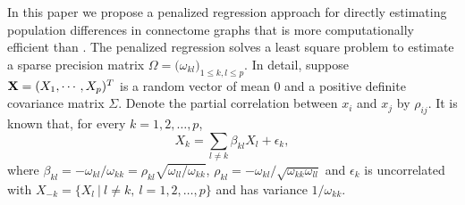 \documentclass[useAMS,usenatbib,referee]{bio}
\begin{document}
In this paper we propose a penalized regression approach for directly estimating population differences in connectome graphs that is more computationally efficient than \citet{Zhao:2014}. The penalized regression solves a least square problem to estimate a sparse precision matrix $\Omega=\big(\omega_{kl} \big)_{1\le k,l\le p}$. In detail, suppose ${\bf X}= (X_1 ,\cdots, X_p)^T$ is a random vector of mean $0$ and a positive definite covariance matrix $\Sigma$.  
Denote the partial correlation between $x_i$ and $x_j$ by $\rho_{ij}$.
It is known that, for every $k=1,2,\ldots,p$,
\begin{equation} \label{eqn:pcorr_reg}
X_k = \sum_{l \neq k} \beta_{kl} X_l + \epsilon_k,
\end{equation}
where $\beta_{kl}=- \omega_{kl}/\omega_{kk} = \rho_{kl} \sqrt{ \omega_{ll} / \omega_{kk} }$, $\rho_{kl}=-\omega_{kl}/\sqrt{\omega_{kk}\omega_{ll}}$ and $\epsilon_k$ is uncorrelated with $X_{-k}=\{ X_l~|~ l \neq k,~
l=1,2,\ldots,p\}$ and has variance $1/\omega_{kk}$. 
\end{document}

